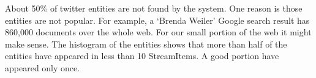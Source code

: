 About 50\% of twitter entities are not found by the system. One reason
is those entities are not popular. For example, a `Brenda Weiler' Google 
search result has 860,000 documents over the whole web. For our 
small portion of the web it might make sense. The 
histogram of the entities shows that more than half of the 
entities have appeared in less than 10 StreamItems. A good portion have 
appeared only once.



